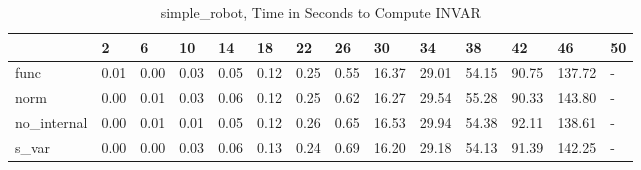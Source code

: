 \begin{table}
\caption{simple_robot, Time in Seconds to Compute INVAR}
\label{simple_robot_INVAR_time}
\begin{tabular}{llllllllllllll}
\toprule
 & 2 & 6 & 10 & 14 & 18 & 22 & 26 & 30 & 34 & 38 & 42 & 46 & 50 \\
\midrule
func & 0.01 & 0.00 & 0.03 & 0.05 & 0.12 & 0.25 & 0.55 & 16.37 & 29.01 & 54.15 & 90.75 & 137.72 & - \\
norm & 0.00 & 0.01 & 0.03 & 0.06 & 0.12 & 0.25 & 0.62 & 16.27 & 29.54 & 55.28 & 90.33 & 143.80 & - \\
no_internal & 0.00 & 0.01 & 0.01 & 0.05 & 0.12 & 0.26 & 0.65 & 16.53 & 29.94 & 54.38 & 92.11 & 138.61 & - \\
s_var & 0.00 & 0.00 & 0.03 & 0.06 & 0.13 & 0.24 & 0.69 & 16.20 & 29.18 & 54.13 & 91.39 & 142.25 & - \\
\bottomrule
\end{tabular}
\end{table}
